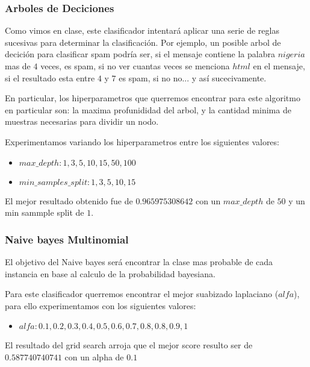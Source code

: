 \subsubsection{Arboles de Deciciones}

Como vimos en clase, este clasificador intentará aplicar una serie de reglas sucesivas para determinar la clasificación. Por ejemplo, un posible arbol de decición para clasificar spam podría ser, si el mensaje contiene la palabra $nigeria$ mas de $4$ veces, es spam, si no ver cuantas veces se menciona $html$ en el mensaje, si el resultado esta entre $4$ y $7$ es spam, si no no... y así sucecivamente.

En particular, los hiperparametros que querremos encontrar para este algoritmo en particular son: la maxima profunididad del arbol, y la cantidad minima de muestras necesarias para dividir un nodo.

Experimentamos variando los hiperparametros entre los siguientes valores:

\begin{itemize}
\item $max\_depth: 1,3,5,10,15,50,100$ 
\item $min\_samples\_split: 1,3,5,10,15$
\end{itemize}

El mejor resultado obtenido fue de $0.965975308642$ con un $max\_depth$ de $50$ y un min sammple split de $1$.



\subsubsection{Naive bayes Multinomial}

El objetivo del Naive bayes será encontrar la clase mas probable de cada instancia en base al calculo de la probabilidad bayesiana. 

Para este clasificador querremos encontrar el mejor suabizado laplaciano ($alfa$), para ello experimentamos con los siguientes valores:
\begin{itemize}
\item $alfa: 0.1,0.2,0.3,0.4,0.5,0.6,0.7,0.8,0.8,0.9,1$
\end{itemize}

El resultado del grid search arroja que el mejor score resulto ser de $0.587740740741$ con un alpha de $0.1$


